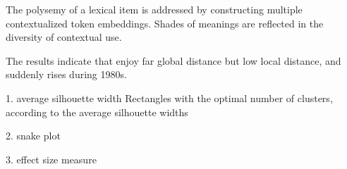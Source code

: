 
The polysemy of a lexical item is addressed by constructing multiple contextualized token embeddings. Shades of meanings are reflected in the diversity of contextual use.

The results indicate that \jia enjoy far global distance but low local distance, and suddenly rises during 1980s.

1. average silhouette width \parencite{levshina2015linguistics}
Rectangles with the optimal number of clusters, according to the average silhouette widths

2. snake plot

3. effect size measure

